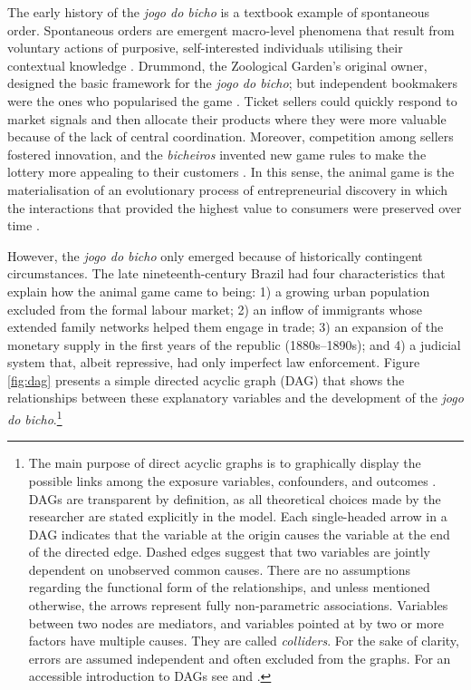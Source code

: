 The early history of the \emph{jogo do bicho} is a textbook example of spontaneous order. Spontaneous orders are emergent macro-level phenomena that result from voluntary actions of purposive, self-interested individuals utilising their contextual knowledge \citep{boettke1990theory, boettke2005methodological, hayek1945use, hayek1960constitution, hayek1973law, leeson2008coordination, menger1871grundsatze, polanyi1948planning, polanyi1951logic}. Drummond, the Zoological Garden's original owner, designed the basic framework for the \emph{jogo do bicho}; but independent bookmakers were the ones who popularised the game \citep[77]{magalhaes2005ganhou}. Ticket sellers could quickly respond to market signals and then allocate their products where they were more valuable because of the lack of central coordination. Moreover, competition among sellers fostered innovation, and the \emph{bicheiros} invented new game rules to make the lottery more appealing to their customers \citep[61]{mello1989historia}. In this sense, the animal game is the materialisation of an evolutionary process of entrepreneurial discovery in which the interactions that provided the highest value to consumers were preserved over time \citep{boettke2008gordon, boettke2014entrepreneurship, buchanan1964should, hayek1978competition, kirzner1997entrepreneurial}.

However, the \emph{jogo do bicho} only emerged because of historically contingent circumstances. The late nineteenth-century Brazil had four characteristics that explain how the animal game came to being: 1) a growing urban population excluded from the formal labour market; 2) an inflow of immigrants whose extended family networks helped them engage in trade; 3) an expansion of the monetary supply in the first years of the republic (1880s--1890s); and 4) a judicial system that, albeit repressive, had only imperfect law enforcement. Figure \ref{fig:dag} presents a simple directed acyclic graph (DAG) \citep{pearl2009causality} that shows the relationships between these explanatory variables and the development of the \emph{jogo do bicho}.\footnote{The main purpose of direct acyclic graphs is to graphically display the possible links among the exposure variables, confounders, and outcomes \citep{morgan2014counterfactuals, pearl2009causality}. DAGs are transparent by definition, as all theoretical choices made by the researcher are stated explicitly in the model. Each single-headed arrow in a DAG indicates that the variable at the origin causes the variable at the end of the directed edge. Dashed edges suggest that two variables are jointly dependent on unobserved common causes. There are no assumptions regarding the functional form of the relationships, and unless mentioned otherwise, the arrows represent fully non-parametric associations. Variables between two nodes are mediators, and variables pointed at by two or more factors have multiple causes. They are called \emph{colliders}. For the sake of clarity, errors are assumed independent and often excluded from the graphs. For an accessible introduction to DAGs see \citet[cha3--4]{morgan2014counterfactuals} and \citet{pearl2016causal}.}


